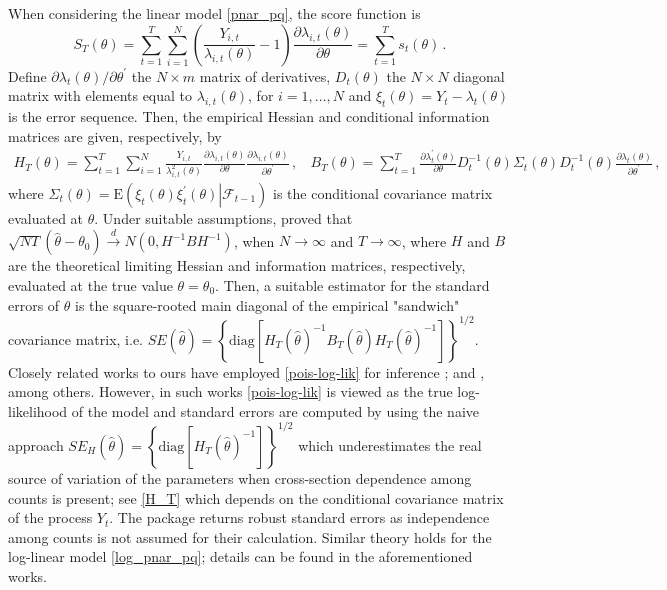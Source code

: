 When considering the linear model \eqref{pnar_pq}, the score function is 
\begin{equation}
	S_{T}(\theta)=\sum_{t=1}^{T}\sum_{i=1}^{N}\left(  \frac{Y_{i,t}}{\lambda_{i,t}(\theta)}-1\right) \frac{\partial\lambda_{i,t}(\theta)}{\partial\theta}
	=\sum_{t=1}^{T}s_{t}(\theta)
	\,.
	\label{score_poisson}
\end{equation}
Define $\partial\lambda_t(\theta)/\partial\theta^\prime$ the $N\times m$ matrix of derivatives, $D_t(\theta)$ the $N\times N$ diagonal matrix with elements equal to $\lambda_{i,t}(\theta)$, for $i=1,\dots,N$ and $\xi_t(\theta)=Y_t-\lambda_t(\theta)$ is the error sequence. Then, the empirical Hessian and conditional information matrices are given, respectively, by
\begin{align}
	H_{T}(\theta)=\sum_{t=1}^{T}\sum_{i=1}^{N}\frac{Y_{i,t}}{\lambda_{i,t}^2(\theta)}\frac{\partial\lambda_{i,t}(\theta)}{\partial\theta}\frac{\partial\lambda_{i,t}(\theta)}{\partial\theta^\prime}\,,
	~~~~
	B_{T}(\theta)=\sum_{t=1}^{T}\frac{\partial\lambda^\prime_t(\theta)}{\partial\theta}D^{-1}_t(\theta)\Sigma_t(\theta) D^{-1}_t(\theta)\frac{\partial\lambda_t(\theta)}{\partial\theta^\prime}\,,
	\label{H_T} 
\end{align}
where $\Sigma_t(\theta)=\mathrm{E}\left( \xi_t(\theta)\xi_t^\prime(\theta)\left| \right. \mathcal{F}_{t-1} \right) $ is the conditional covariance matrix evaluated at $\theta$. Under suitable assumptions, \cite{armillotta_fokianos_2021} proved  that  $ \sqrt{NT}(\hat{\theta}-\theta_0)\xrightarrow{d}N(0,H^{-1}BH^{-1})$, when $N\to\infty$ and $T\to\infty$, where $H$ and $B$ are the theoretical limiting Hessian and information matrices, respectively, evaluated at the true value  $\theta=\theta_0$.
Then, a suitable estimator for the standard errors of $\theta$ is the square-rooted main diagonal of the empirical "sandwich" covariance matrix, i.e. $SE(\hat{\theta}) = \left\lbrace \text{diag} \left[ H_T(\hat{\theta})^{-1}B_T(\hat{\theta})H_T(\hat{\theta})^{-1}\right] \right\rbrace ^{1/2}$. Closely related works to ours 
have employed  \eqref{pois-log-lik} for inference ; \cite{paul_etal_2008} and \cite{paul_etal_2011}, among others. However, in such works
\eqref{pois-log-lik} is viewed  as the true log-likelihood of the model
and standard errors are computed  by using  the naive approach  $SE_H(\hat{\theta}) = \left\lbrace \text{diag} \left[ H_T(\hat{\theta})^{-1} \right] \right\rbrace ^{1/2}$ which  underestimates the real source of variation of the parameters when cross-section dependence among counts is present; see \eqref{H_T} which  
depends on the conditional covariance matrix of the process $Y_t$.  The package   returns  robust standard errors as independence among counts is not assumed for their calculation. 
Similar theory holds for the log-linear model \eqref{log_pnar_pq}; details can be found in the aforementioned works.


